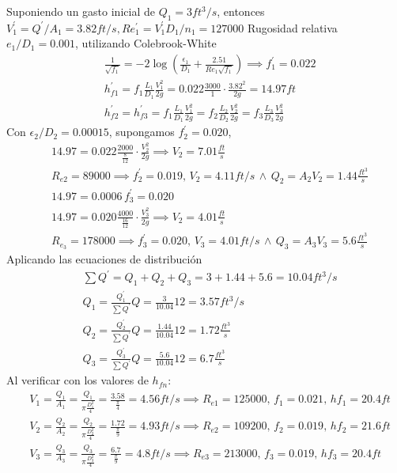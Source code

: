 Suponiendo un gasto inicial de $Q_1=3 ft^3/s$, entonces $V_1^{\prime}= Q^{\prime}/A_1 = 3.82 ft/s, Re_1^{\prime}= V_1^{\prime} D_1/n_1=127000$ Rugosidad relativa $e_1/D_1 = 0.001$, utilizando Colebrook-White 
\begin{align*}
    &\frac{1}{\sqrt{f_1}} = - 2 \log{\left(\frac{\epsilon_1}{D_1} + \frac{2.51}{Re_1 \sqrt{f_1}}\right)} \implies f_1^{\prime} = 0.022\\
    &h_{f1}^{\prime} = f_1\frac{L_1}{D_1}\frac{V_1^2}{2g} = 0.022\frac{3000}{1}\cdot \frac{3.82^2}{2g} =14.97ft\\
    &h^{\prime}_{f2} = h^{\prime}_{f3} = f_1\frac{L_1}{D_1}\frac{V_1^2}{2g} = f_2 \frac{L_2}{D_2}\frac{V_2^2}{2g} = f_3 \frac{L_3}{D_3}\frac{V_3^2}{2g} 
\end{align*}
Con $\epsilon_2/D_2 = 0.00015$, supongamos $f_2^{\prime} = 0.020$,
\begin{align*}
    &14.97 = 0.022\frac{2000}{\frac{8}{12}}\cdot \frac{V_2^2}{2g} \implies V_2 = 7.01 \frac{ft}{s}\\
    &R_{e2} = 89000\implies f_2^{\prime} = 0.019,\, V_2 = 4.11 ft/s\,\land\,Q_2 = A_2V_2 = 1.44\frac{ft^3}{s}\\
    &14.97 = 0.0006\, f_3^{\prime} = 0.020\\
    &14.97 = 0.020\frac{4000}{\frac{16}{12}}\cdot \frac{V_3^2}{2g} \implies V_2 = 4.01 \frac{ft}{s}\\
    &R_{e_3} = 178000\implies f_3^{\prime} = 0.020,\, V_3 = 4.01 ft/s\,\land\,Q_3 = A_3V_3 = 5.6\frac{ft^3}{s}
\end{align*}
Aplicando las ecuaciones de distribución
\begin{align*}
    &\sum Q^{\prime} = Q_1 + Q_2 + Q_3 = 3 + 1.44 + 5.6 = 10.04 ft^3/s\\
    &Q_1 = \frac{Q_1^{\prime}}{\sum Q^{\prime}}Q = \frac{3}{10.04}12 = 3.57 ft^3/s\\
    &Q_2 = \frac{Q_2^{\prime}}{\sum Q^{\prime}}Q = \frac{1.44}{10.04}12 = 1.72\frac{ft^3}{s}\\
    &Q_3 = \frac{Q_3^{\prime}}{\sum Q^{\prime}}Q = \frac{5.6}{10.04}12 = 6.7\frac{ft^3}{s}
\end{align*}
Al verificar con los valores de $h_{fn}$:
\begin{align*}
    &V_1 = \frac{Q_1}{A_1} = \frac{Q_1}{\pi \frac{D_1^2}{4}} = \frac{3.58}{\frac{\pi}{4}} = 4.56 ft/s\implies R_{e1} = 125000,\,f_1 = 0.021,\,hf_1 = 20.4ft\\
    &V_2 = \frac{Q_2}{A_2} = \frac{Q_2}{\pi \frac{D_2^2}{4}} = \frac{1.72}{\frac{\pi}{9}} = 4.93 ft/s\implies R_{e2} = 109200,\,f_2 = 0.019,\, hf_2 = 21.6ft\\
    &V_3 = \frac{Q_3}{A_3} = \frac{Q_3}{\pi \frac{D_3^2}{4}} = \frac{6.7}{\frac{\pi}{9}} = 4.8 ft/s\implies R_{e3} = 213000,\,f_3 = 0.019,\, hf_3 = 20.4ft
\end{align*}
